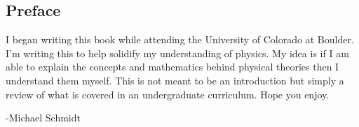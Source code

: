 \subsection*{Preface}
	\indent
	I began writing this book while attending the University of Colorado at Boulder.
	I'm writing this to help solidify my understanding of physics.
	My idea is if I am able to explain the concepts and mathematics behind physical theories then I understand them myself.
	This is not meant to be an introduction but simply a review of what is covered in an undergraduate curriculum.
	Hope you enjoy.\\
	\begin{flushright}
		-Michael Schmidt\\
	\end{flushright}
